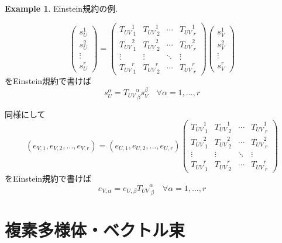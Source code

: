 \documentclass[dvipdfmx,a4paper,11pt]{article} %
\theoremstyle{definition}
\newtheorem{ex}[thm]{Example}
\theoremstyle{remark}
\numberwithin{equation}{section}
\begin{document}
\begin{ex}
Einstein規約の例. 

\begin{equation}
\begin{pmatrix}
s_U^1\\
s_U^2\\
\vdots\\
s_U^r
\end{pmatrix}
=
\begin{pmatrix}
{T_{UV}}^{1}_{\ 1} & {T_{UV}}^{1}_{\ 2}& \cdots & {T_{UV}}^{1}_{\ r}\\
{T_{UV}}^{2}_{\ 1} & {T_{UV}}^{2}_{\ 2}& \cdots & {T_{UV}}^{2}_{\ r}\\
\vdots & \vdots & \ddots & \vdots\\
{T_{UV}}^{r}_{\ 1}& {T_{UV}}^{r}_{\ 2}& \cdots & {T_{UV}}^{r}_{\ r}
\end{pmatrix}
\begin{pmatrix}
s_V^1\\
s_V^2\\
\vdots\\
s_V^r
\end{pmatrix}
\end{equation}
をEinstein規約で書けば
\begin{equation}
s_U^{\alpha} = {T_{UV}}^{\alpha}_{\ \beta}s^{\beta}_V
\quad \forall \alpha=1, \ldots, r
\end{equation}

同様にして
\begin{equation} 
(e_{V,1}, e_{V,2},\ldots,e_{V,r})
=
(e_{U,1}, e_{U,2},\ldots,e_{U,r})
\begin{pmatrix}
{T_{UV}}^{1}_{\ 1} & {T_{UV}}^{1}_{\ 2}& \cdots & {T_{UV}}^{1}_{\ r}\\
{T_{UV}}^{2}_{\ 1} & {T_{UV}}^{2}_{\ 2}& \cdots & {T_{UV}}^{2}_{\ r}\\
\vdots & \vdots & \ddots & \vdots\\
{T_{UV}}^{r}_{\ 1}& {T_{UV}}^{r}_{\ 2}& \cdots & {T_{UV}}^{r}_{\ r}
\end{pmatrix}
\end{equation}
をEinstein規約で書けば
\begin{equation}
e_{V,\alpha} = 
e_{U,\beta}
{T_{UV}}^{\alpha}_{\ \beta}
\quad \forall \alpha=1, \ldots, r
\end{equation}
\end{ex}

\newpage

\section{複素多様体・ベクトル束}
\label{sec-cpx}
\end{document}
